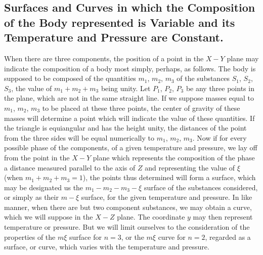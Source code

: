 \documentclass[12pt]{article}
\begin{document}
\subsection{Surfaces and Curves in which the Composition of the Body represented is Variable and its Temperature and Pressure are Constant.}
When there are three components, the position of a point in the 
$X\!-Y$ plane may indicate the composition of a body most simply, perhaps, as follows. The body is supposed to be composed of the quantities $m_1$, $m_2$, $m_3$ 
of the substances $S_1$, $S_2$, $S_3$, the value of $m_1 + m_2 + m_3$ 
being unity. Let $P_1$, $P_2$, $P_3$ be any three points in the plane, which are not in the same straight line. If we suppose masses equal to $m_1$, $m_2$, $m_3$ to be placed at these three points, the center of gravity of these masses will determine a point which will indicate the value of these quantities. If the triangle is equiangular and has the height unity, the distances of the point from the three sides will be equal numerically to $m_1$, $m_2$, $m_3$. 
Now if for every possible phase of the components, of a given temperature and pressure, we lay off from the point in the $X\!-Y$ plane which represents the composition of the phase a distance measured parallel to the axis of $Z$ and representing the value of $\xi$ (when $m_1 + m_2 + m_3 = 1$), the points thus determined will form a surface, which may be designated us the $m_1 \! - m_2 \! - m_3 \! - \xi$ surface of the substances considered, or simply as their $m \! - \xi$ surface, for the given temperature and pressure. In like manner, when there are but two component substances, we may obtain a curve, which we will suppose in the $X\!-\!Z$ plane. The coordinate $y$ may then represent temperature or pressure. But we will limit ourselves to the consideration of the properties of the $m\! \xi$ surface for $n= 3$, or the $m\! \xi$ curve for $n = 2$, regarded as a surface, or curve, which varies with the temperature and pressure.
\end{document}
